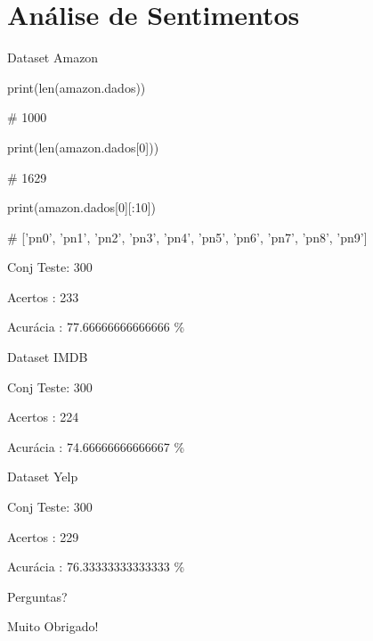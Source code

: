 \documentclass[darkblue]{beamer}
\begin{document}
    \section{Análise de Sentimentos}

    \begin{frame}{Dataset Amazon}
        \begin{block}{}
        print(len(amazon.dados))
        
        \# 1000
        
        print(len(amazon.dados[0]))
        
        \# 1629
        
        print(amazon.dados[0][:10])
        
        \# ['pn0', 'pn1', 'pn2', 'pn3', 'pn4', 'pn5', 'pn6', 'pn7', 'pn8', 'pn9']
        \end{block}
        \begin{block}{}
        Conj Teste: 300
        
        Acertos   : 233
    
        Acurácia  : 77.66666666666666 \%
        \end{block}
    \end{frame}
    
    \begin{frame}{Dataset IMDB}
        \begin{block}{}
        Conj Teste: 300
        
        Acertos   : 224
    
        Acurácia  : 74.66666666666667 \%
        \end{block}
    \end{frame}
    
    \begin{frame}{Dataset Yelp}
        \begin{block}{}
        Conj Teste: 300
        
        Acertos   : 229
    
        Acurácia  : 76.33333333333333 \%
        \end{block}
    \end{frame}
    
    \begin{frame}
    	\label{perg}
    	\begin{center} 
    		\Huge Perguntas?
    	\end{center} 
    \end{frame}
    
    \begin{frame}
    	\begin{center} 
    		\Huge Muito Obrigado!
    	\end{center} 
    \end{frame}
\end{document}
